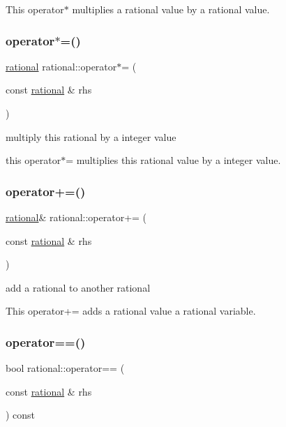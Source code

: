 This operator$\ast$ multiplies a rational value by a rational value. \mbox{\label{classrational_a2b5729aef261d16cd18ff7c7fcbf8c6e}} 
\subsubsection{\texorpdfstring{operator$\ast$=()}{operator*=()}}
{\footnotesize\ttfamily \hyperlink{classrational}{rational} rational\+::operator$\ast$= (\begin{DoxyParamCaption}\item[{const \hyperlink{classrational}{rational} \&}]{rhs }\end{DoxyParamCaption})\hspace{0.3cm}{\ttfamily [inline]}}



multiply this rational by a integer value 

this operator$\ast$= multiplies this rational value by a integer value. \mbox{\label{classrational_a9b83ad0c803d2ac242b42e71d954a356}} 
\subsubsection{\texorpdfstring{operator+=()}{operator+=()}}
{\footnotesize\ttfamily \hyperlink{classrational}{rational}\& rational\+::operator+= (\begin{DoxyParamCaption}\item[{const \hyperlink{classrational}{rational} \&}]{rhs }\end{DoxyParamCaption})\hspace{0.3cm}{\ttfamily [inline]}}



add a rational to another rational 

This operator+= adds a rational value a rational variable. \mbox{\label{classrational_a8b565720ea15ddfb17ea202e27698478}} 
\subsubsection{\texorpdfstring{operator==()}{operator==()}}
{\footnotesize\ttfamily bool rational\+::operator== (\begin{DoxyParamCaption}\item[{const \hyperlink{classrational}{rational} \&}]{rhs }\end{DoxyParamCaption}) const\hspace{0.3cm}{\ttfamily [inline]}}



